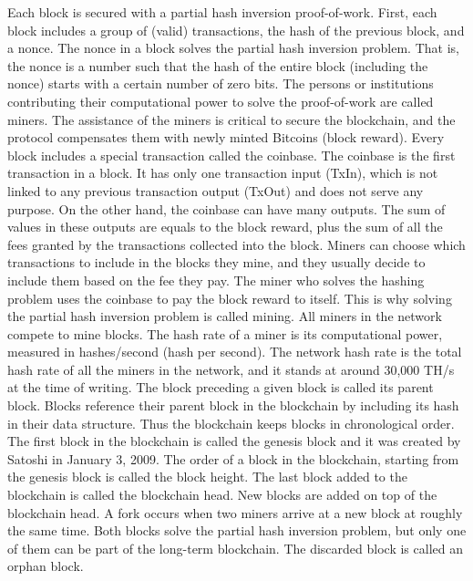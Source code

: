 \documentclass{article}
\begin{document}
Each block is secured with a partial hash inversion proof-of-work. First, each block includes a group of (valid) transactions, the hash of the previous block, and a nonce. The nonce in a block solves the partial hash inversion problem. That is, the nonce is a number such that the hash of the entire block (including the nonce) starts with a certain number of zero bits.\newline
The persons or institutions contributing their computational power to solve the proof-of-work are called miners. The assistance of the miners is critical to secure the blockchain, and the protocol compensates them with newly minted Bitcoins (block reward).\newline
Every block includes a special transaction called the coinbase. The coinbase is the first transaction in a block. It has only one transaction input (TxIn), which is not linked to any previous transaction output (TxOut) and does not serve any purpose. On the other hand, the coinbase can have many outputs. The sum of values in these outputs are equals to the block reward, plus the sum of all the fees granted by the transactions collected into the block. Miners can choose which transactions to include in the blocks they mine, and they usually decide to include them based on the fee they pay. The miner who solves the hashing problem uses the coinbase to pay the block reward to itself. This is why solving the partial hash inversion problem is called mining. All miners in the network compete to mine blocks. The hash rate of a miner is its computational power, measured in hashes/second (hash per second). The network hash rate is the total hash rate of all the miners in the network, and it stands at around 30,000 TH/s at the time of writing.\newline
The block preceding a given block is called its parent block. Blocks reference their parent block in the blockchain by including its hash in their data structure. Thus the blockchain keeps blocks in chronological order. The first block in the blockchain is called the genesis block and it was created by Satoshi in January 3, 2009.\newline
The order of a block in the blockchain, starting from the genesis block is called the block height. The last block added to the blockchain is called the blockchain head. New blocks are added on top of the blockchain head.\newline
A fork occurs when two miners arrive at a new block at roughly the same time. Both blocks solve the partial hash inversion problem, but only one of them can be part of the long-term blockchain. The discarded block is called an orphan block.\newline
\end{document}
